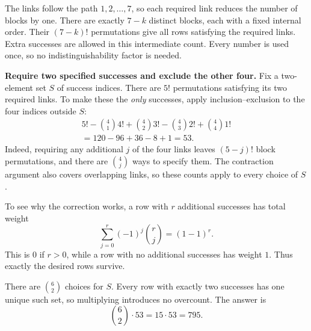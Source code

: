 \documentclass[11pt]{article}
\begin{document}
The links follow the path $1,2,\ldots,7$, so each required link reduces
the number of blocks by one. There are exactly $7-k$ distinct blocks,
each with a fixed internal order. Their $(7-k)!$ permutations give all
rows satisfying the required links. Extra successes are allowed in this
intermediate count. Every number is used once, so no indistinguishability
factor is needed.

\textbf{Require two specified successes and exclude the other four.}
Fix a two-element set $S$ of success indices. There are $5!$ permutations
satisfying its two required links. To make these the \emph{only} successes,
apply inclusion--exclusion to the four indices outside $S$:
\[
\begin{gathered}
5!-\binom41 4!+\binom42 3!-\binom43 2!+\binom44 1!\\
=120-96+36-8+1=53.
\end{gathered}
\]
Indeed, requiring any additional $j$ of the four links leaves
$(5-j)!$ block permutations, and there are $\binom4j$ ways to specify them.
The contraction argument also covers overlapping links, so these counts
apply to every choice of $S$.

To see why the correction works, a row with $r$ additional successes
has total weight
\[
\sum_{j=0}^{r}(-1)^j\binom rj=(1-1)^r.
\]
This is $0$ if $r>0$, while a row with no additional successes has weight
$1$. Thus exactly the desired rows survive.

There are $\binom62$ choices for $S$. Every row with exactly two successes
has one unique such set, so multiplying introduces no overcount. The answer is
\[
\binom62\cdot53=15\cdot53=\boxed{795}.
\]

\endgroup
\end{document}
